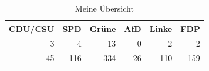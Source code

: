 \begin{table}
\caption{Meine Übersicht}
\label{tab:meine_tabelle}
\begin{tabular}{rrrrrr}
\toprule
CDU/CSU & SPD & Grüne & AfD & Linke & FDP \\
\midrule
3 & 4 & 13 & 0 & 2 & 2 \\
45 & 116 & 334 & 26 & 110 & 159 \\
\bottomrule
\end{tabular}
\end{table}
